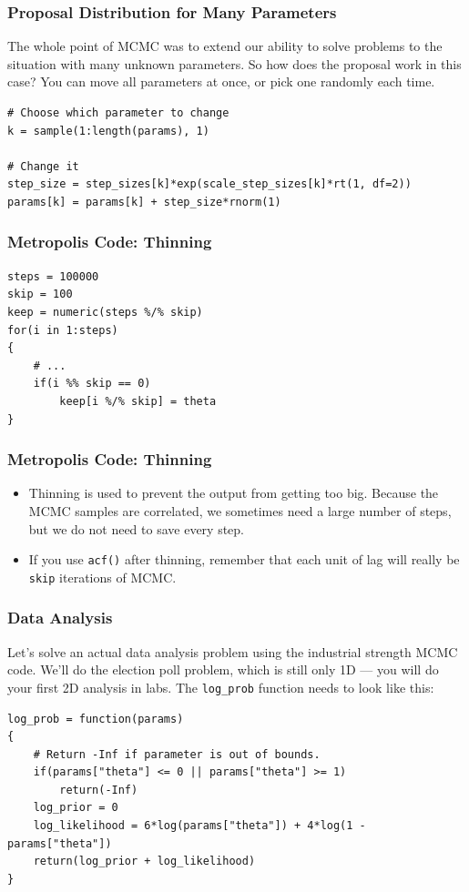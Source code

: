 \documentclass{beamer}
\begin{document}
\begin{frame}[fragile]
\frametitle{Proposal Distribution for Many Parameters}
The whole point of MCMC was to extend our ability to solve problems to the
situation with many unknown parameters. So how does the proposal work in this
case? You can move all parameters at once, or pick one randomly each time.

{\small
\begin{verbatim}
# Choose which parameter to change
k = sample(1:length(params), 1)

# Change it
step_size = step_sizes[k]*exp(scale_step_sizes[k]*rt(1, df=2))
params[k] = params[k] + step_size*rnorm(1)
\end{verbatim}
} %

\end{frame}





\begin{frame}[fragile]
\frametitle{Metropolis Code: Thinning}
\begin{verbatim}
steps = 100000
skip = 100
keep = numeric(steps %/% skip)
for(i in 1:steps)
{
    # ...
    if(i %% skip == 0)
        keep[i %/% skip] = theta
}
\end{verbatim}
\end{frame}


\begin{frame}[fragile]
\frametitle{Metropolis Code: Thinning}
\begin{itemize}
\item Thinning is used to prevent the output from getting too big.
Because the MCMC samples are correlated, we sometimes need a large number
of steps, but we do not need to save every step. \pause
\item If you use \texttt{acf()} after thinning, remember that each unit
of lag will really be \texttt{skip} iterations of MCMC.
\end{itemize}
\end{frame}



\begin{frame}[fragile]
\frametitle{Data Analysis}
Let's solve an actual data analysis problem using the industrial strength
MCMC code. We'll do the election poll problem, which is still only 1D --- you
will do your first 2D analysis in labs. The \texttt{log_prob} function
needs to look like this:
{\footnotesize
\begin{verbatim}
log_prob = function(params)
{
    # Return -Inf if parameter is out of bounds.
    if(params["theta"] <= 0 || params["theta"] >= 1)
        return(-Inf)
    log_prior = 0
    log_likelihood = 6*log(params["theta"]) + 4*log(1 - params["theta"])
    return(log_prior + log_likelihood)
}
\end{verbatim}
} %

\end{frame}
\end{document}
